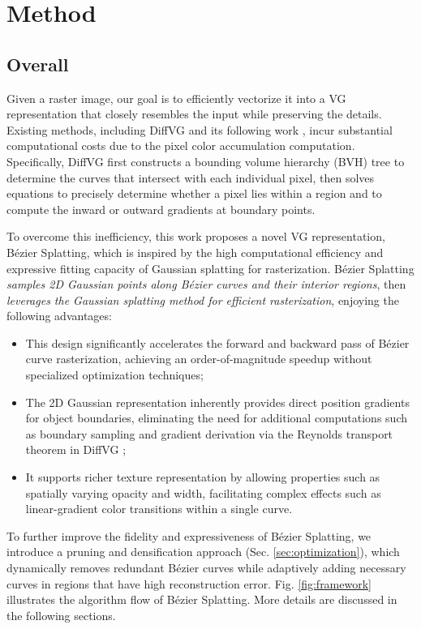 
\vspace{-.5em}
\section{Method}
\vspace{-.5em}

\subsection{Overall}
\vspace{-.5em}

Given a raster image, our goal is to efficiently vectorize it into a VG representation that closely resembles the input while preserving the details. Existing methods, including DiffVG \cite{Li:2020:DVG} and its following work \cite{xu2022live, Chen_2024_CVPR}, incur substantial computational costs due to the pixel color accumulation computation. Specifically, DiffVG first constructs a bounding volume hierarchy (BVH) tree to determine the curves that intersect with each individual pixel, then solves equations to precisely determine whether a pixel lies within a region and to compute the inward or outward gradients at boundary points. 


To overcome this inefficiency, this work proposes a novel VG representation, Bézier Splatting, which is inspired by the high computational efficiency and expressive fitting capacity of Gaussian splatting \cite{zhang2024gaussianimage} for rasterization. Bézier Splatting \textit{samples 2D Gaussian points along Bézier curves and their interior regions}, then \textit{leverages
the Gaussian splatting method for efficient rasterization}, enjoying the following advantages:
\begin{itemize}\setlength{\itemsep}{3pt}
    \item This design significantly accelerates the forward and backward pass of Bézier curve rasterization, achieving an order-of-magnitude speedup without specialized optimization techniques;
    \item The 2D Gaussian representation inherently provides direct position gradients for object boundaries, eliminating the need for additional computations such as boundary sampling and gradient derivation via the Reynolds transport theorem in DiffVG \cite{Li:2020:DVG};
    \item It supports richer texture representation by allowing properties such as spatially varying opacity and width, facilitating complex effects such as linear-gradient color transitions within a single curve.
\end{itemize}
To further improve the fidelity and expressiveness of Bézier Splatting, we introduce a pruning and densification approach (Sec. \ref{sec:optimization}), which dynamically removes redundant Bézier curves while adaptively adding necessary curves in regions that have high reconstruction error. Fig. \ref{fig:framework} illustrates the algorithm flow of Bézier Splatting. More details are discussed in the following sections.


